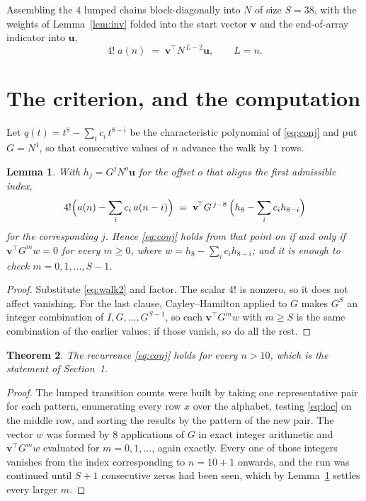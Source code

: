 \documentclass[11pt,a4paper]{article}
\theoremstyle{plain}
\newtheorem{theorem}{Theorem}
\newtheorem{lemma}[theorem]{Lemma}
\theoremstyle{definition}
\begin{document}
Assembling the $4$ lumped chains block-diagonally into $N$ of size $S=38$, with the
weights of Lemma~\ref{lem:inv} folded into the start vector $\mathbf{v}$ and the
end-of-array indicator into $\mathbf{u}$,
\begin{equation}\label{eq:walk2}
4!\;a(n)\;=\;\mathbf{v}^{\!\top}N^{\,L-2}\mathbf{u},\qquad L=n .
\end{equation}

\section{The criterion, and the computation}

Let $q(t)=t^{8}-\sum_i c_i\,t^{8-i}$ be the characteristic polynomial of
\eqref{eq:conj} and put $G=N^{1}$, so that consecutive values of $n$ advance the
walk by $1$ rows.

\begin{lemma}\label{lem:crit}
With $h_j=G^{j}N^{o}\mathbf{u}$ for the offset $o$ that aligns the first admissible
index,
\[
4!\Bigl(a(n)-\sum_i c_i\,a(n-i)\Bigr)\;=\;\mathbf{v}^{\!\top}G^{\,j-8}\,
\Bigl(h_{8}-\sum_i c_i h_{8-i}\Bigr)
\]
for the corresponding $j$. Hence \eqref{eq:conj} holds from that point on if and only if
$\mathbf{v}^{\!\top}G^{m}w=0$ for every $m\ge0$, where
$w=h_{8}-\sum_i c_ih_{8-i}$; and it is enough to check $m=0,1,\dots,S-1$.
\end{lemma}

\begin{proof}
Substitute \eqref{eq:walk2} and factor. The scalar $4!$ is nonzero, so it does not
affect vanishing. For the last clause, Cayley--Hamilton applied to $G$ makes $G^{S}$ an
integer combination of $I,G,\dots,G^{S-1}$, so each $\mathbf{v}^{\!\top}G^{m}w$ with
$m\ge S$ is the same combination of the earlier values; if those vanish, so do all the rest.
\end{proof}

\begin{theorem}
The recurrence \eqref{eq:conj} holds for every $n>10$, which is the statement of
Section~1.
\end{theorem}

\begin{proof}
The lumped transition counts were built by taking one representative pair for each pattern,
enumerating every row $x$ over the alphabet, testing \eqref{eq:loc} on the middle
row, and sorting the results by the pattern of the new pair. The vector $w$ was formed by
$8$ applications of $G$ in exact integer arithmetic and $\mathbf{v}^{\!\top}G^{m}w$
evaluated for $m=0,1,\dots$, again exactly. Every one of those integers vanishes from the
index corresponding to $n=10+1$ onwards, and the run was continued until $S+1$
consecutive zeros had been seen, which by Lemma~\ref{lem:crit} settles every larger $m$.
\end{proof}
\end{document}

